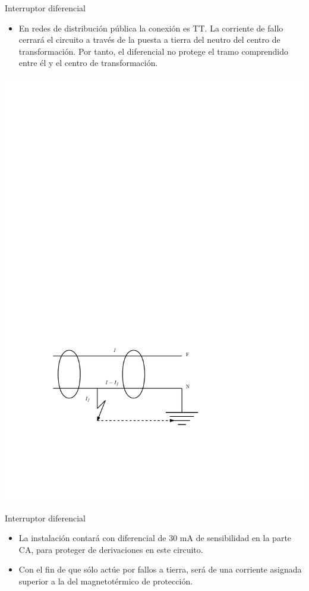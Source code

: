 \documentclass[xcolor={usenames,svgnames,dvipsnames}]{beamer}
\begin{document}
\begin{frame}[label=sec-5-2-5]{Interruptor diferencial}
\begin{itemize}
\item En redes de distribución pública la conexión es TT. La corriente de
fallo cerrará el circuito a través de la puesta a tierra del neutro
del centro de transformación. Por tanto, el diferencial \alert{no} protege
el tramo comprendido entre él y el centro de transformación.
\end{itemize}

\includegraphics[width=.9\linewidth]{../figs/InterruptorDiferencial.pdf}
\end{frame}

\begin{frame}[label=sec-5-2-6]{Interruptor diferencial}
\begin{itemize}
\item La instalación contará con diferencial de 30 mA de sensibilidad en la
parte CA, para proteger de derivaciones en este circuito.

\item Con el fin de que sólo actúe por fallos a tierra, será de una
corriente asignada superior a la del magnetotérmico de protección.
\end{itemize}
\end{frame}
\end{document}
